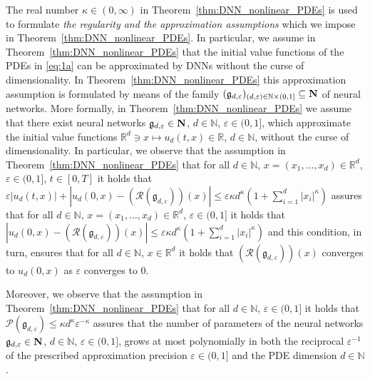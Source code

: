 \documentclass[12pt,AutoFakeBold,AutoFakeSlant]{article}
\theoremstyle{definition}
\newcommand{\R}{\mathbb{R}}
\newcommand{\N}{\mathbb{N}}
\begin{document}
	The real number $ \kappa \in (0,\infty) $ 
	in Theorem~\ref{thm:DNN_nonlinear_PDEs}  
	is used to formulate 
	\emph{the regularity and 
	the approximation assumptions} 
	which we impose in Theorem~\ref{thm:DNN_nonlinear_PDEs}. 
	In particular, we assume in Theorem~\ref{thm:DNN_nonlinear_PDEs} 
	that the initial value functions of the PDEs in \eqref{eq:1a} 
	can be approximated by DNNs without the curse of dimensionality. 
	In Theorem~\ref{thm:DNN_nonlinear_PDEs} this approximation assumption 
	is formulated by means of the family 
	$ 
	(\mathfrak{g}_{d,\varepsilon} )_{ (d,\varepsilon) \in \N \times (0,1] } 
	\subseteq {\bf N} 
	$
	of neural networks. 
	More formally, 
	in Theorem~\ref{thm:DNN_nonlinear_PDEs} 
	we assume that there exist neural networks   
	$ \mathfrak{g}_{d,\varepsilon} \in {\bf N} $,
	$ 
	d \in \N 
	$,
	$
	\varepsilon \in (0,1] 
	$,
	which approximate 
	the initial value functions 
	$ 
	\R^d \ni x \mapsto u_d( t, x ) \in \R 
	$,
	$ d \in \N $, 
	without the curse of dimensionality. 
	In particular, we observe that the assumption 
	in Theorem~\ref{thm:DNN_nonlinear_PDEs} that 
	for all 
	$ d \in \N $, $ x = (x_1, \dots, x_d) \in \R^d $, 
	$ \varepsilon \in (0,1] $, $ t \in [0,T] $ 
	it holds that
	$ 
	\varepsilon | u_d(t,x) | 
	+ \allowbreak 
	| u_d(0,x) \allowbreak - ( \mathcal{R}(\mathfrak{g}_{d,\varepsilon}) )(x) | 
	\le \varepsilon \kappa d^\kappa (1 + \sum_{ i = 1 }^d | x_i |^\kappa ) 
	$
	assures that 
	for all 
	$ d \in \N $, $ x = (x_1, \dots, x_d) \in \R^d $, 
	$ \varepsilon \in (0,1] $
	it holds that
	$ 
	| u_d(0,x) \allowbreak - ( \mathcal{R}(\mathfrak{g}_{d,\varepsilon}) )(x) | 
	\le \varepsilon \kappa d^\kappa (1 + \sum_{ i = 1 }^d | x_i |^\kappa ) 
	$
	and this condition, in turn, ensures 
	that for all $ d \in \N $, $ x \in \R^d $ 
	it holds that 
	$
	( \mathcal{R}(\mathfrak{g}_{d,\varepsilon}) )(x)
	$
	converges to 
	$
	u_d(0,x)
	$
	as 
	$ \varepsilon $
	converges to $ 0 $. 



	Moreover, we observe that the assumption 
	in Theorem~\ref{thm:DNN_nonlinear_PDEs} that 
	for all $ d \in \N $, 
	$ \varepsilon \in (0,1] $
	it holds that 
	$
	\mathcal{P}(\mathfrak{g}_{d,\varepsilon}) \le \kappa d^\kappa \varepsilon^{-\kappa} 
	$
	assures that the number of parameters 
	of the neural networks 
	$ \mathfrak{g}_{d,\varepsilon} \in {\bf N} $,
	$ 
	d \in \N 
	$,
	$
	\varepsilon \in (0,1] 
	$,
	grows at most polynomially 
	in both the reciprocal $ \varepsilon^{ - 1 } $ 
	of the prescribed approximation precision 
	$ \varepsilon \in (0,1] $
	and the PDE dimension $ d \in \N $. 
\end{document}
